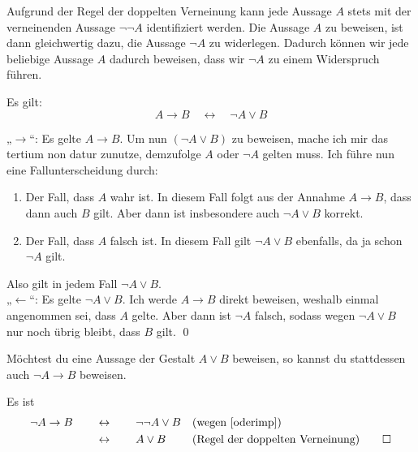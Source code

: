 \begin{bem}
 Aufgrund der Regel der doppelten Verneinung kann jede Aussage $A$ stets mit der verneinenden Aussage $\neg\neg A$ identifiziert werden. Die Aussage $A$ zu beweisen, ist dann gleichwertig dazu, die Aussage $\neg A$ zu widerlegen. Dadurch können wir jede beliebige Aussage $A$ dadurch beweisen, dass wir $\neg A$ zu einem Widerspruch führen.
\end{bem}





\begin{sat} \label{oderimp}
Es gilt:
 \[ A\to B\quad \leftrightarrow\quad \neg A\lor B \]
\end{sat}
\begin{bew}[(*)]
 „$\to$“: Es gelte $A\to B$. Um nun $(\neg A\lor B)$ zu beweisen, mache ich mir das tertium non datur zunutze, demzufolge $A$ oder $\neg A$ gelten muss. Ich führe nun eine Fallunterscheidung durch:
 \begin{enumerate}
  \item Der Fall, dass $A$ wahr ist. In diesem Fall folgt aus der Annahme $A\to B$, dass dann auch $B$ gilt. Aber dann ist insbesondere auch $\neg A\lor B$ korrekt.
  \item Der Fall, dass $A$ falsch ist. In diesem Fall gilt $\neg A\lor B$ ebenfalls, da ja schon $\neg A$ gilt.
 \end{enumerate}
Also gilt in jedem Fall $\neg A\lor B$. \\[0.5em]
„$\leftarrow$“: Es gelte $\neg A\lor B$. Ich werde $A\to B$ direkt beweisen, weshalb einmal angenommen sei, dass $A$ gelte. Aber dann ist $\neg A$ falsch, sodass wegen $\neg A\lor B$ nur noch übrig bleibt, dass $B$ gilt. \qed
\end{bew}




\begin{sat} \label{oderperimplikation}
 Möchtest du eine Aussage der Gestalt $A\lor B$ beweisen, so kannst du stattdessen auch $\neg A\to B$ beweisen.
\end{sat}
\begin{bew}
Es ist
 \begin{align*}
  \neg A\to B \qquad &\leftrightarrow\qquad \neg\neg A\lor B && (\text{wegen \cref{oderimp}})\\
  & \leftrightarrow\qquad A\lor B && (\text{Regel der doppelten Verneinung}) \qed
 \end{align*}
\end{bew}


